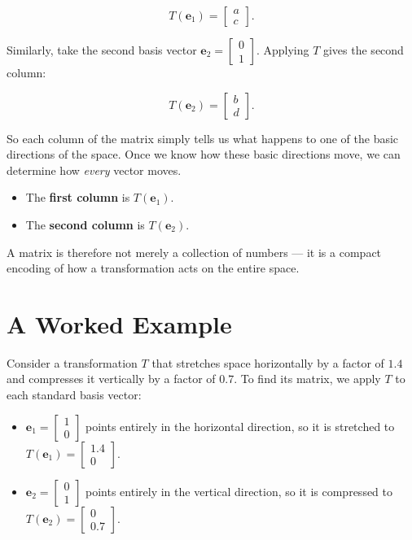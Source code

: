 \documentclass[11pt,openany]{book}
\theoremstyle{definition}
\begin{document}
\[
T(\mathbf{e}_1) = \begin{bmatrix} a \\ c \end{bmatrix}.
\]

\medskip

Similarly, take the second basis vector $\mathbf{e}_2 = \begin{bmatrix}0 \\ 1\end{bmatrix}$. 
Applying $T$ gives the second column:

\[
T(\mathbf{e}_2) = \begin{bmatrix} b \\ d \end{bmatrix}.
\]

\medskip

So each column of the matrix simply tells us what happens to one of the basic directions 
of the space. Once we know how these basic directions move, we can determine how 
\textit{every} vector moves.

\begin{itemize}
  \item The \textbf{first column} is $T(\mathbf{e}_1)$.
  \item The \textbf{second column} is $T(\mathbf{e}_2)$.
\end{itemize}

A matrix is therefore not merely a collection of numbers --- it is a compact encoding of 
how a transformation acts on the entire space.

\section{A Worked Example}

Consider a transformation $T$ that stretches space horizontally by a factor of $1.4$ and 
compresses it vertically by a factor of $0.7$. To find its matrix, we apply $T$ to each 
standard basis vector:

\begin{itemize}
  \item $\mathbf{e}_1 = \begin{bmatrix} 1 \\ 0 \end{bmatrix}$ points entirely in the 
  horizontal direction, so it is stretched to 
  $T(\mathbf{e}_1) = \begin{bmatrix} 1.4 \\ 0 \end{bmatrix}$.
  \item $\mathbf{e}_2 = \begin{bmatrix} 0 \\ 1 \end{bmatrix}$ points entirely in the 
  vertical direction, so it is compressed to 
  $T(\mathbf{e}_2) = \begin{bmatrix} 0 \\ 0.7 \end{bmatrix}$.
\end{itemize}
\end{document}
